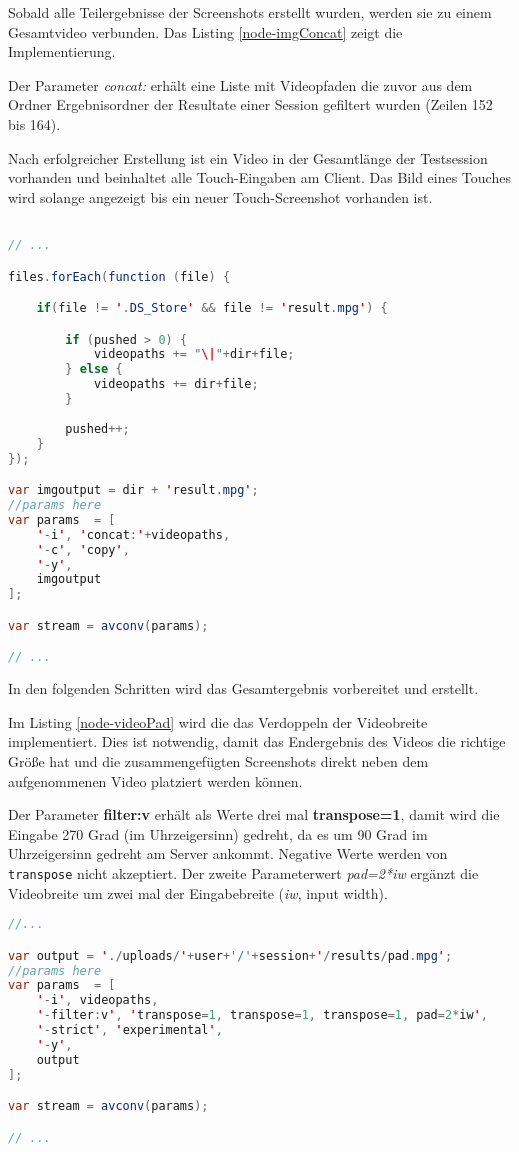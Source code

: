 Sobald alle Teilergebnisse der Screenshots erstellt wurden, werden sie zu einem Gesamtvideo verbunden. 
Das Listing \ref{node-imgConcat} zeigt die Implementierung. 

Der Parameter \textit{concat:} erhält eine Liste mit Videopfaden die zuvor aus dem Ordner Ergebnisordner der Resultate einer Session gefiltert wurden (Zeilen 152 bis 164). 

Nach erfolgreicher Erstellung ist ein Video in der Gesamtlänge der Testsession vorhanden und beinhaltet alle Touch-Eingaben am Client. 
Das Bild eines Touches wird solange angezeigt bis ein neuer Touch-Screenshot vorhanden ist. 

\begin{lstlisting}[label=node-imgConcat,language=Java, caption=Screenshot-Videos zu einem Videos konkatenieren, firstnumber=149]

// ...

files.forEach(function (file) {

	if(file != '.DS_Store' && file != 'result.mpg') {

		if (pushed > 0) {
			videopaths += "\|"+dir+file;
		} else {
			videopaths += dir+file;
		}
		
		pushed++;
	}
});

var imgoutput = dir + 'result.mpg';
//params here
var params  = [
	'-i', 'concat:'+videopaths,
	'-c', 'copy',
	'-y',
	imgoutput
];

var stream = avconv(params);

// ...
\end{lstlisting}

In den folgenden Schritten wird das Gesamtergebnis vorbereitet und erstellt. 

Im Listing \ref{node-videoPad} wird die das Verdoppeln der Videobreite implementiert. 
Dies ist notwendig, damit das Endergebnis des Videos die richtige Größe hat und die zusammengefügten Screenshots direkt neben dem aufgenommenen Video platziert werden können. 

Der Parameter \textbf{filter:v} erhält als Werte drei mal \textbf{transpose=1}, damit wird die Eingabe 270 Grad (im Uhrzeigersinn) gedreht, da es um 90 Grad im Uhrzeigersinn gedreht am Server ankommt. Negative Werte werden von \texttt{transpose} nicht akzeptiert. Der zweite Parameterwert \emph{pad=2*iw} ergänzt die Videobreite um zwei mal der Eingabebreite (\emph{iw}, input width).

\begin{lstlisting}[label=node-videoPad,language=Java, caption=Erstellung der Ergebnisgrundlage, firstnumber=196]
//...

var output = './uploads/'+user+'/'+session+'/results/pad.mpg';
//params here
var params  = [
	'-i', videopaths,
	'-filter:v', 'transpose=1, transpose=1, transpose=1, pad=2*iw',
	'-strict', 'experimental',
	'-y',
	output
];

var stream = avconv(params);

// ...
\end{lstlisting}

